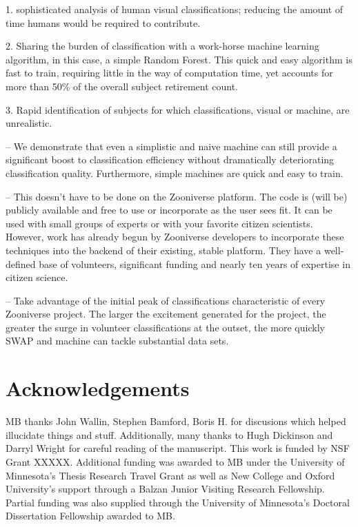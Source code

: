 \documentclass[twocolumn]{aastex6}
\begin{document}
1. sophisticated analysis of human visual classifications; reducing the amount of time
humans would be required to contribute. 

2. Sharing the burden of classification with a work-horse machine learning algorithm, 
in this case, a simple Random Forest. This quick and easy algorithm is fast to train, 
requiring little in the way of computation time, yet accounts for more than 50\% of 
the overall subject retirement count. 

3. Rapid identification of subjects for which classifications, visual or machine, are
unrealistic. 


-- We demonstrate that even a simplistic and naive machine can still provide a 
significant boost to classification efficiency without dramatically deteriorating 
classification quality. Furthermore, simple machines are quick and easy to train. 

-- This doesn't have to be done on the Zooniverse platform. The code is (will be) 
publicly available and free to use or incorporate as the user sees fit. It can be used
with small groups of experts or with your favorite citizen scientists. However, 
work has already begun by Zooniverse developers to incorporate these techniques
into the backend of their existing, stable platform. They have a well-defined base 
of volunteers, significant funding and nearly ten years of expertise in citizen science. 


-- Take advantage of the initial peak of classifications characteristic of every
Zooniverse project. The larger the excitement generated for the project, the greater
the surge in volunteer classifications at the outset, the more quickly SWAP and
machine can tackle substantial data sets. 


\section{Acknowledgements}
MB thanks John Wallin, Stephen Bamford, Boris H. for discusions which helped illucidate things and stuff. 
Additionally, many thanks to Hugh Dickinson and Darryl Wright for careful reading of the manuscript. 
This work is funded by NSF Grant XXXXX. Additional funding was awarded to MB 
under the University of Minnesota's Thesis Research Travel Grant as well as
New College and Oxford University's support through a Balzan Junior Visiting 
Research Fellowship. Partial funding was also supplied through the University of
Minnesota's Doctoral Dissertation Fellowship awarded to MB. 
\end{document}
